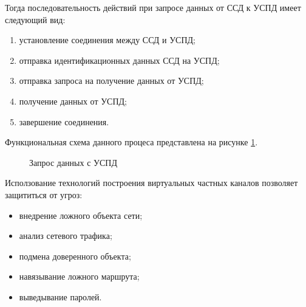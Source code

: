 Тогда последовательность действий при запросе данных от ССД к УСПД имеет следующий вид:

\begin{enumerate}
 \item установление соединения между ССД и УСПД;
 \item отправка идентификационных данных ССД на УСПД;
 \item отправка запроса на получение данных от УСПД;
 \item получение данных от УСПД;
 \item завершение соединения.
\end{enumerate}

Функциональная схема данного процеса представлена на рисунке \ref{img:get_data_idef0}.

\begin{figure}[!ht]
 \caption{Запрос данных с УСПД}
 \label{img:get_data_idef0}
\end{figure}

Исползование технологий построения виртуальных частных каналов позволяет защититься от угроз:

\begin{itemize}
 \item внедрение ложного объекта сети;
 \item анализ сетевого трафика;
 \item подмена доверенного объекта;
 \item навязывание ложного маршрута;
 \item выведывание паролей.
\end{itemize}
